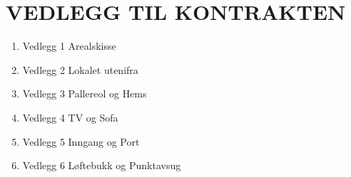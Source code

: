 \section{VEDLEGG TIL KONTRAKTEN}


    \begin{enumerate}


        \item Vedlegg 1 Arealskisse

        \item Vedlegg 2 Lokalet utenifra

        \item Vedlegg 3 Pallereol og Hems

        \item Vedlegg 4 TV og Sofa

        \item Vedlegg 5 Inngang og Port

        \item Vedlegg 6 Løftebukk og Punktavsug


    \end{enumerate}
